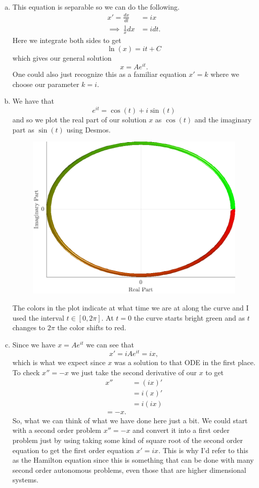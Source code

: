 \documentclass[12pt]{article} %
\begin{document}
\begin{solution}~
\begin{enumerate}[(a)]
    \item This equation is separable so we can do the following.
    \begin{align*}
        x' = \frac{dx}{dt}&= ix\\
        \implies~ \frac{1}{x}dx &= idt.
    \end{align*}
Here we integrate both sides to get
\[
\ln(x) = it+C
\]
which gives our general solution
\[
\boxed{x}=Ae^{it}.
\]
One could also just recognize this as a familiar equation $x'=k$ where we choose our parameter $k=i$.
\item We have that
\[
e^{it} = \cos(t)+i\sin(t)
\]
and so we plot the real part of our solution $x$ as $\cos(t)$ and the imaginary part as $\sin(t)$ using Desmos.
\begin{figure}[H]
    \centering
    \includegraphics[width=.5\textwidth]{circular_curve.png}
\end{figure}
The colors in the plot indicate at what time we are at along the curve and I used the interval $t\in [0,2\pi]$. At $t=0$ the curve starts bright green and as $t$ changes to $2\pi$ the color shifts to red.
\item Since we have $x=Ae^{it}$ we can see that 
\[
x'=iAe^{it}=ix,
\]
which is what we expect since $x$ was a solution to that ODE in the first place. To check $x''=-x$ we just take the second derivative of our $x$ to get
\begin{align*}
x''&=(ix)'\\
&=i(x)'\\
&=i(ix)\\
=-x.
\end{align*}
So, what we can think of what we have done here just a bit. We could start with a second order problem $x''=-x$ and convert it into a first order problem just by using taking some kind of square root of the second order equation to get the first order equation $x'=ix$. This is why I'd refer to this as the Hamilton equation since this is something that can be done with many second order autonomous problems, even those that are higher dimensional systems.


\end{enumerate}
\end{solution}
\end{document}
